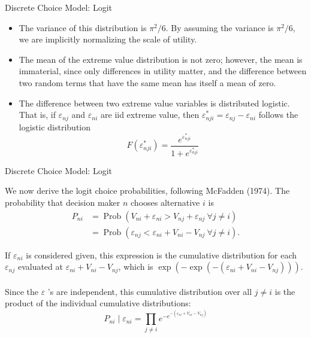 \begin{frame}{Discrete Choice Model: Logit}
\begin{itemize}
\item The variance of this distribution is $\pi^2 / 6$. By assuming the variance is $\pi^2 / 6$, we are implicitly normalizing the scale of utility.
\item The mean of the extreme value distribution is not zero; however, the mean is immaterial, since only differences in utility matter, and the difference between two random terms that have the same mean has itself a mean of zero.
\item The difference between two extreme value variables is distributed logistic. That is, if $\varepsilon_{n j}$ and $\varepsilon_{n i}$ are iid extreme value, then $\varepsilon_{n j i}^*=\varepsilon_{n j}-\varepsilon_{n i}$ follows the logistic distribution
$$
F\left(\varepsilon_{n j i}^*\right)=\frac{e^{\varepsilon_{n j i}^*}}{1+e^{\varepsilon_{n j i}^*}}
$$
\end{itemize}
\end{frame}




\begin{frame}{Discrete Choice Model: Logit}

We now derive the logit choice probabilities, following McFadden (1974). The probability that decision maker $n$ chooses alternative $i$ is
$$
\begin{aligned}
P_{n i} & =\operatorname{Prob}\left(V_{n i}+\varepsilon_{n i}>V_{n j}+\varepsilon_{n j} \ \forall j \neq i\right) \\
& =\operatorname{Prob}\left(\varepsilon_{n j}<\varepsilon_{n i}+V_{n i}-V_{n j} \ \forall j \neq i\right).
\end{aligned}
$$

If $\varepsilon_{n i}$ is considered given, this expression is the cumulative distribution for each $\varepsilon_{n j}$ evaluated at $\varepsilon_{n i}+V_{n i}-V_{n j}$, which is $\exp \left(-\exp \left(-\left(\varepsilon_{n i}+V_{n i}-V_{n j}\right)\right)\right)$.
\\ \hspace*{\fill} \\
Since the $\varepsilon$ 's are independent, this cumulative distribution over all $j \neq i$ is the product of the individual cumulative distributions:
$$
P_{n i} \mid \varepsilon_{n i}=\prod_{j \neq i} e^{-e^{-\left(\varepsilon_{n i}+V_{n i}-V_{n j}\right)}}
$$

\end{frame}



